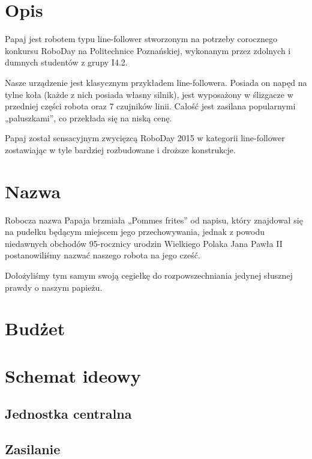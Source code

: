 \documentclass{article}
\begin{document}

\tableofcontents
\newpage

\section{Opis}

Papaj jest robotem typu line-follower stworzonym na potrzeby corocznego konkursu RoboDay na Politechnice Poznańskiej, wykonanym przez zdolnych i dumnych studentów z grupy I4.2. 

Nasze urządzenie jest klasycznym przykładem line-followera. Posiada on napęd na tylne koła (każde z nich posiada własny silnik), jest wyposażony w ślizgacze w przedniej części robota oraz 7 czujników linii. Całość jest zasilana popularnymi „paluszkami”, co przekłada się na niską cenę.

Papaj został sensacyjnym zwycięzcą RoboDay 2015 w kategorii line-follower zostawiając w tyle bardziej rozbudowane i droższe konstrukcje.

\section{Nazwa}
				
Robocza nazwa Papaja brzmiała „Pommes frites” od napisu, który znajdował się na pudełku będącym miejscem jego przechowywania, jednak z powodu niedawnych obchodów 95-rocznicy urodzin Wielkiego Polaka Jana Pawła II postanowiliśmy nazwać naszego robota na jego cześć.

Dołożyliśmy tym samym swoją cegiełkę do rozpowszechniania jedynej słusznej prawdy o naszym papieżu. 
						
\section{Budżet}


\section{Schemat ideowy}

\subsection{Jednostka centralna}


\subsection{Zasilanie}

\end{document}

